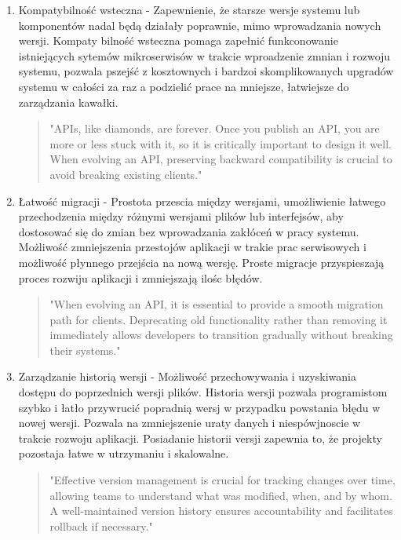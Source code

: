 \documentclass[runningheads,12pt]{llncs}
\begin{document}
\begin{enumerate}
    \item Kompatybilność wsteczna - Zapewnienie, że starsze wersje systemu lub komponentów nadal będą działały poprawnie, mimo wprowadzania nowych wersji. Kompaty bilność wsteczna pomaga zapełnić funkconowanie istniejących sytemów mikroserwisów w trakcie wproadzenie zmnian i rozwoju systemu, pozwala pszejść z kosztownych i bardzoi skomplikowanych upgradów systemu w całości za raz a podzielić prace na mniejsze, łatwiejsze do zarządzania kawałki.
    \begin{quote}
        "APIs, like diamonds, are forever. Once you publish an API, you are more or less stuck with it, so it is critically important to design it well. When evolving an API, preserving backward compatibility is crucial to avoid breaking existing clients." ~\cite[p. 75]{bloch2018effective}
    \end{quote}
    \item Łatwość migracji - Prostota przescia między wersjami, umożliwienie łatwego przechodzenia między różnymi wersjami plików lub interfejsów, aby dostosować się do zmian bez wprowadzania zakłóceń w pracy systemu. Możliwość zmniejszenia przestojów aplikacji w trakie prac serwisowych i możliwość płynnego przejścia na nową wersję. Proste migracje przyspieszają proces rozwiju aplikacji i zmniejszają ilośc błędów.
    \begin{quote}
        "When evolving an API, it is essential to provide a smooth migration path for clients. Deprecating old functionality rather than removing it immediately allows developers to transition gradually without breaking their systems." ~\cite[p. 78]{bloch2018effective}
    \end{quote}
    \item Zarządzanie historią wersji - Możliwość przechowywania i uzyskiwania dostępu do poprzednich wersji plików. Historia wersji pozwala programistom szybko i łatło przywrucić popradnią wersj w przypadku powstania błędu w nowej wersji. Pozwala na zmniejszenie uraty danych i niespówjnoscie w trakcie rozwoju aplikacji. Posiadanie historii versji zapewnia to, że projekty pozostaja łatwe w utrzymaniu i skalowalne.
    \begin{quote}
        "Effective version management is crucial for tracking changes over time, allowing teams to understand what was modified, when, and by whom. A well-maintained version history ensures accountability and facilitates rollback if necessary." ~\cite[p. 150]{rubin2012essential}
    \end{quote}

\end{enumerate}
\end{document}
